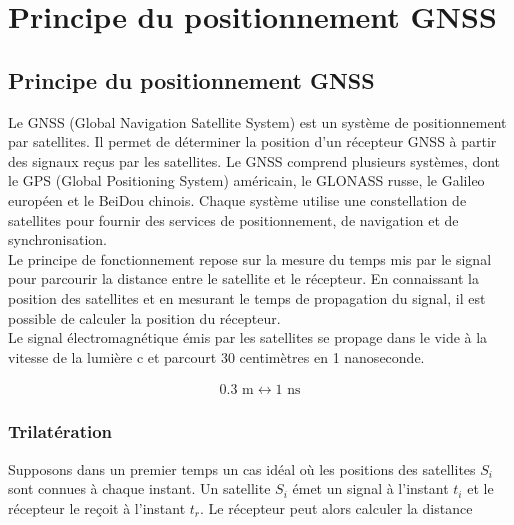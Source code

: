 
  
\chapter{Principe du positionnement GNSS}
\label{principe_positionnement_gnss}
\thispagestyle{fancy}
\pagestyle{fancy}

\section{Principe du positionnement GNSS}

Le GNSS (Global Navigation Satellite System) est un système de positionnement par satellites. 
Il permet de déterminer la position d'un récepteur GNSS à partir des signaux reçus par les satellites. 
Le GNSS comprend plusieurs systèmes, dont le GPS (Global Positioning System) américain, le GLONASS russe, le Galileo européen et le BeiDou chinois. 
Chaque système utilise une constellation de satellites pour fournir des services de positionnement, de navigation et de synchronisation.\\
Le principe de fonctionnement repose sur la mesure du temps mis par le signal pour parcourir la distance entre le satellite et le récepteur. 
En connaissant la position des satellites et en mesurant le temps de propagation du signal, il est possible de calculer la position du récepteur.\\
Le signal électromagnétique émis par les satellites se propage dans le vide à la vitesse de la lumière c et parcourt 30 centimètres en 1 nanoseconde.

\begin{align}
0.3 \text{ m} \longleftrightarrow 1 \text{ ns}
\end{align}

\subsection{Trilatération}

Supposons dans un premier temps un cas idéal où les positions des satellites $S_i$ sont connues à chaque instant.
Un satellite $S_i$ émet un signal à l'instant $t_i$ et le récepteur le reçoit à l'instant $t_r$.
Le récepteur peut alors calculer la distance

